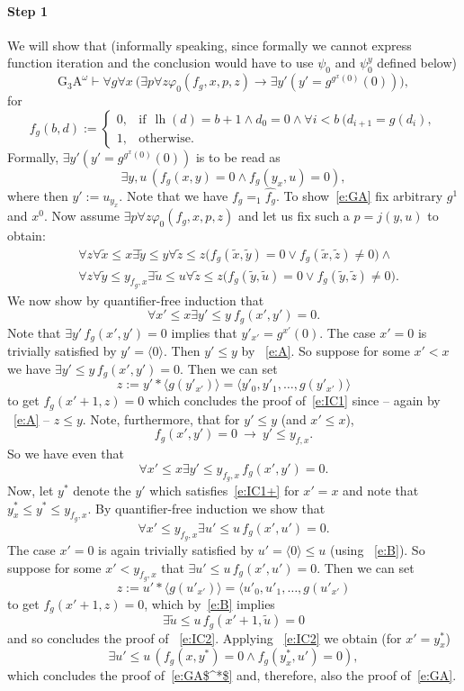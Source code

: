 \documentclass[1p]{elsarticle}
\newcommand{\be}[1][{e:\arabic{equation}}] { \begin{equation}\label{#1} }
\newcommand{\ee} { \end{equation} }
\DeclareMathOperator{\lh}{lh}  %
\newcommand{\Tif}{\text{if}\ }
\newcommand{\Telse}{\text{otherwise}}
\theoremstyle{plain}
\theoremstyle{definition}
\theoremstyle{remark}
\renewenvironment{proof}[1][]{\noindent{\bf Proof{#1}. }}{\nopagebreak[4]{\hspace*{\fill}
  $\Box$              %
 }{\vspace{2ex}}}
\renewcommand{\phi}{\varphi}
\theoremstyle{definition}
\begin{document}
{\begin{proof}
\paragraph{Step 1} We will show that (informally speaking, since 
formally we cannot express function iteration and the conclusion would have to use $\psi_0$ and $\psi^y_0$ defined below)
\[
\mbox{G$_3$A}^\omega\vdash \forall g \forall x\ \big(\exists p\forall z\phi_0(f_g,x,p,z)\rightarrow \exists y'(y'=g^{g^{x}(0)}(0))\big),
\tag{GA}\label{e:GA}
\]
for \[
f_g(b,d):=\begin{cases}
0,&\Tif \ \lh(d) = b+1 \wedge d_0=0\wedge \forall i< b\ (d_{i+1}=g(d_i),\\
1,&\Telse.
\end{cases}
\]
Formally, $\exists y' (y'=g^{g^x(0)}(0))$ is to be read as 
\[ \exists y,u \, (f_g(x,y)=0\wedge f_g(y_x,u)=0),
\tag{GA$^*$}\label{e:GA$^*$} \] 
where then $y':=u_{y_x}.$  
Note that we have $f_g=_1\widehat{f_g}$. To show~\eqref{e:GA} fix arbitrary $g^1$ and $x^0$.
Now assume $\exists p\forall z\phi_0(f_g,x,p,z)$ and let us fix such 
a $p=j(y,u)$ to obtain:
\begin{align}
&\forall z\forall\tilde x \leq x \exists \tilde y\leq y \forall \tilde z\leq z 
\big(f_g(\tilde x,\tilde y)=0\vee f_g(\tilde x,\tilde z)\neq0\big) \label{e:A}
\wedge \\
&\forall z\forall\tilde y \leq y_{f_g,x} \exists \tilde u\leq u \forall \tilde z\leq z 
\big(f_g(\tilde y,\tilde u)=0\vee f_g(\tilde y,\tilde z)\neq0\big). \label {e:B}
\end{align}
We now show by quantifier-free induction that 
\be[e:IC1]
\forall x'\leq x \exists y'\leq y\ f_g(x',y')=0.
\ee
Note that $\exists y'\,f_g(x',y')=0$ implies that $y'_{x'}=g^{x'}(0).$ 
The case $x'=0$ is trivially satisfied by $y'=\langle 0 \rangle$. Then 
$y'\le y$ by ~\eqref{e:A}. So suppose for some $x'<x$ we have
$\exists y'\leq y\,f_g(x',y')=0.$ Then we can set 
\[
z:=y'*\langle g(y'_{x'}) \rangle =\langle y'_0,y'_1,\ldots,g(y'_{x'})\rangle
\] to get $f_g(x'+1,z)=0$
which concludes the proof of~\eqref{e:IC1} since -- again by 
~\eqref{e:A} -- $z\le y.$ Note, furthermore,
that for $y'\leq y$ (and $x'\leq x$),
\[ f_g(x',y')=0\ \rightarrow\ y'\leq y_{f,x}.\] 
So we have even that \\
\be[e:IC1+]
\forall x'\leq x \exists y'\leq y_{f_g,x}\, f_g(x',y')=0.
\ee
Now, let $y^*$ denote the $y'$ which satisfies~\eqref{e:IC1+} for $x'=x$ and 
note that $y^*_x\le y^*\le y_{f_g,x}.$ 
By quantifier-free induction we show that 
\be[e:IC2]\forall x'\leq y_{f_g,x} \exists u'\leq u \, f_g(x',u')=0.\ee
The case $x'=0$ is again trivially satisfied by $u'=\langle 0 \rangle \le u$ 
(using ~\eqref{e:B}). 
So suppose for some $x'< y_{f_g,x}$ that
$\exists u'\leq u \,f_g(x',u')=0$. Then we can set
\[z:=u'*\langle g(u'_{x'})\rangle= \langle u'_0,u'_1,\ldots,g(u'_{x'})\] to get $f_g(x'+1,z)=0$,
which by~\eqref{e:B} implies 
\[\exists \tilde u\leq u \,f_g(x'+1, \tilde u)=0\]
and so concludes the proof of ~\eqref{e:IC2}. Applying ~\eqref{e:IC2} 
we obtain (for $x'=y^*_x$)
\[
\exists u'\leq u\, (f_g(x,y^*)=0\wedge f_g(y^*_x,u')=0),
\]
which concludes the proof of~\eqref{e:GA$^*$} and, therefore, 
also the proof of~\eqref{e:GA}.\\

\end{proof}}
\end{document}
